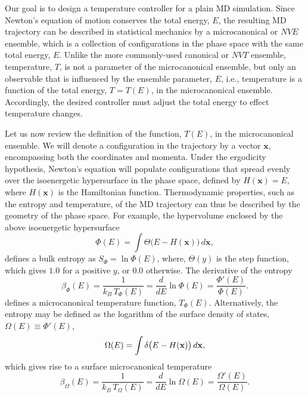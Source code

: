 \documentclass[reprint]{revtex4-1}
\begin{document}
Our goal is to design a temperature controller for a plain MD simulation.
%
Since Newton's equation of motion
conserves the total energy, $E$,
the resulting MD trajectory can be described in statistical mechanics
by a microcanonical or $NVE$ ensemble,
which is a collection of configurations in the phase space
with the same total energy, $E$.
%
Unlike the more commonly-used canonical or $NVT$ ensemble,
temperature, $T$, is not a parameter of the microcanonical ensemble,
but only an observable
that is influenced by the ensemble parameter, $E$,
i.e., temperature is a function of the total energy, $T = T(E)$,
in the microcanonical ensemble.
%
Accordingly, the desired controller must adjust the total energy
to effect temperature changes.


Let us now review the definition of the function, $T(E)$,
in the microcanonical ensemble.
%
We will denote a configuration in the trajectory
by a vector $\mathbf x$,
encompassing both the coordinates and momenta.
%
Under the ergodicity hypothesis,
Newton's equation will populate configurations
that spread evenly over
the isoenergetic hypersurface in the phase space,
defined by
$H(\mathbf x) = E$,
where $H(\mathbf x)$ is the Hamiltonian function.
%
Thermodynamic properties, such as the entropy and temperature,
of the MD trajectory
can thus be described by the geometry of the phase space.
%
For example, the hypervolume enclosed by the above isoenergetic hypersurface
%
\begin{equation}
  \Phi(E)
  =
  \int
    \Theta\bigl( E - H(\mathbf x) \bigr)
    \, d\mathbf x
  ,
  \label{eq:PhiE}
\end{equation}
%
defines a bulk entropy as $S_\Phi = \ln \Phi(E)$,
where, $\Theta(y)$ is the step function,
which gives $1.0$ for a positive $y$, or $0.0$ otherwise.
%
The derivative of the entropy
%
\begin{equation}
  \beta_\Phi(E)
  =
  \frac{1}{ k_B \, T_\Phi(E) }
  =
  \frac{ d }{ dE }
  \ln \Phi(E)
  =
  \frac{ \Phi'(E) }
       { \Phi(E)  }
  .
  \label{eq:betaE_def}
\end{equation}
%
defines a microcanonical temperature function, $T_\Phi(E)$.
%
Alternatively, the entropy may be defined
as the logarithm of the surface density of states,
$\Omega(E) \equiv \Phi'(E)$,
%
\begin{equation}
  \Omega(E)
  =
  \int
    \delta\bigl( E - H(\mathbf x) \bigr)
    \, d\mathbf x
  ,
  \notag
\end{equation}
%
which gives rise to a surface microcanonical temperature
%
\begin{equation}
  \beta_\Omega(E)
  =
  \frac{1}{ k_B \, T_\Omega(E) }
  =
  \frac{ d }{ dE }
  \ln \Omega(E)
  =
  \frac{ \Omega'(E) }
       { \Omega(E)  }
  .
  \label{eq:betaE_surf_def}
\end{equation}
\end{document}
